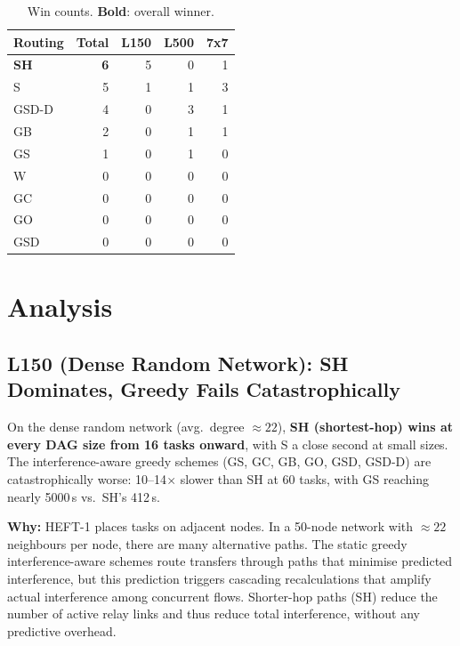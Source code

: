 \documentclass[11pt]{article}
\begin{document}
\begin{table}[H]
\centering
\begin{tabular}{l r r r r}
\toprule
\textbf{Routing} & \textbf{Total} & \textbf{L150} & \textbf{L500} & \textbf{7x7} \\
\midrule
  \textbf{SH} & \textbf{6} & 5 & 0 & 1 \\
  S & 5 & 1 & 1 & 3 \\
  GSD\mbox{-}D & 4 & 0 & 3 & 1 \\
  GB & 2 & 0 & 1 & 1 \\
  GS & 1 & 0 & 1 & 0 \\
  W & 0 & 0 & 0 & 0 \\
  GC & 0 & 0 & 0 & 0 \\
  GO & 0 & 0 & 0 & 0 \\
  GSD & 0 & 0 & 0 & 0 \\
\bottomrule
\end{tabular}
\caption{Win counts. \textbf{Bold}: overall winner.}
\end{table}


\section{Analysis}

\subsection{L150 (Dense Random Network): SH Dominates, Greedy Fails Catastrophically}

On the dense random network (avg.\ degree $\approx22$), \textbf{SH (shortest-hop)
wins at every DAG size from 16 tasks onward}, with S a close second at small sizes.
The interference-aware greedy schemes (GS, GC, GB, GO, GSD, GSD-D) are catastrophically
worse: 10--14$\times$ slower than SH at 60 tasks, with GS reaching nearly 5000\,s
vs.\ SH's 412\,s.

\textbf{Why:} HEFT-1 places tasks on adjacent nodes.  In a 50-node network with
$\approx22$ neighbours per node, there are many alternative paths.  The static
greedy interference-aware schemes route transfers through paths that minimise
predicted interference, but this prediction triggers cascading recalculations that
amplify actual interference among concurrent flows.  Shorter-hop paths (SH) reduce
the number of active relay links and thus reduce total interference, without any
predictive overhead.
\end{document}
